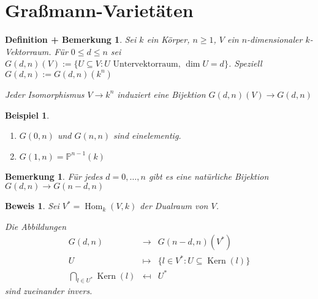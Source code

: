 \documentclass[a4paper, 12pt, numbers=noendperiod, chapterprefix=true, headsepline]{scrbook}
\theoremstyle{break}
\newtheorem{DefBem}[Def]{Definition + Bemerkung}
\newtheorem{Bem}[Def]{Bemerkung}
\theoremstyle{nonumberbreak}
\newtheorem{nnBsp}{Beispiel}
\newtheorem{Bew}{Beweis}
\theoremstyle{nonumberplain}
\newcommand{\quot}[1]{\textrm{\glqq}{#1}\textrm{\grqq}}
\DeclareMathOperator{\Hom}{Hom}
\DeclareMathOperator{\Kern}{Kern}
\newcommand{\IP}{\mathbb{P}}%
\begin{document}
\section{Gra\ss mann-Variet\"aten}

\begin{DefBem}
Sei $k$ ein K\"orper, $n\ge1$, $V$ ein $n$-dimensionaler $k$-Vektorraum. F\"ur $0\le d\le n$ sei $G(d,n)(V):=\{U\subseteq V:U \text{ Untervektorraum, } \dim U=d\}$. \emph{Speziell} $G(d,n):=G(d,n)(k^n)$

Jeder Isomorphismus $V\to k^n$ induziert eine Bijektion $G(d,n)(V)\to G(d,n)$
\end{DefBem}

\begin{nnBsp}\begin{enumerate}[1)]
\item
	$G(0,n)$ und $G(n,n)$ sind einelementig.
\item
	$G(1,n)=\IP^{n-1}(k)$
\end{enumerate}\end{nnBsp}

\begin{Bem}
F\"ur jedes $d=0,\ldots ,n$ gibt es eine \quot{nat\"urliche} Bijektion $G(d,n)\to G(n-d,n)$
\end{Bem}

\begin{Bew}
Sei $V^*=\Hom_k(V,k)$ der Dualraum von $V$.

Die Abbildungen
	\[\begin{array}{rcl}
		G(d,n) &\to& G(n-d,n)(V^*)\\
		U &\mapsto& \{l\in V^* :U\subseteq \Kern(l)\}\\
		\bigcap\limits_{l\in U^*}\Kern(l) &\mapsfrom& U^*
	\end{array}\]
sind zueinander invers.
\end{Bew}
\end{document}
